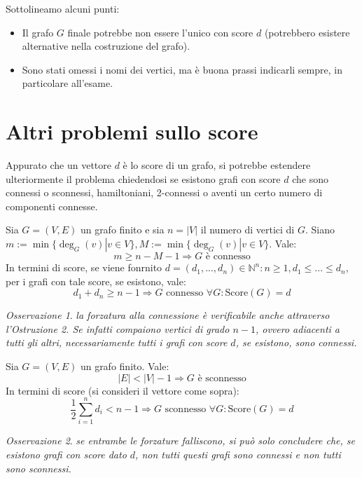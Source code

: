 \documentclass[oneside]{book}
\theoremstyle{remark}
\newtheorem*{osservaz}{Osservazione}
\begin{document}
\noindent Sottolineamo alcuni punti:
\begin{itemize}
    \item Il grafo $G$ finale potrebbe non essere l'unico con score $d$ (potrebbero esistere alternative nella costruzione del grafo).
    \item Sono stati omessi i nomi dei vertici, ma è buona prassi indicarli sempre, in particolare all'esame.
\end{itemize}

\section{Altri problemi sullo score}
Appurato che un vettore $d$ è lo score di un grafo, si potrebbe
estendere ulteriormente il problema chiedendosi se esistono
grafi con score $d$ che sono connessi o sconnessi, hamiltoniani,
2-connessi o aventi un certo numero di componenti connesse.

\begin{tcolorbox}[colback=red!30, colframe=red!30!black, title=Forzatura alla connessione]
Sia $G=(V,E)$ un grafo  finito e sia $n=|V|$ il numero
di vertici di $G$. Siano $m:=\min\{\deg_G(v)|v\in V\},
M:=\min\{\deg_G(v)|v\in V\}$. Vale:
\[ m\geq n-M-1 \Longrightarrow G \text{ è connesso} \]
In termini di score, se viene fonrnito $d=(d_1,...,d_n)\in\mathbb{N}^n:
n\geq1, d_1\leq...\leq d_n$, per i grafi con tale score, se
esistono, vale:
\[ d_1+d_n \geq n-1 \Longrightarrow G\text{ connesso }\forall G:\text{Score}(G)=d \]
\end{tcolorbox}
\begin{osservaz}
\emph{la forzatura alla connessione è verificabile
anche attraverso l'Ostruzione 2. Se infatti compaiono vertici di grado
$n-1$, ovvero adiacenti a tutti gli altri, necessariamente tutti i
grafi con score $d$, se esistono, sono connessi.}
\end{osservaz}

\begin{tcolorbox}[colback=red!30, colframe=red!30!black, title=Forzatura alla sconnessione]
Sia $G=(V,E)$ un grafo finito. Vale:
\[ |E|<|V|-1 \Longrightarrow G \text{ è sconnesso} \]
In termini di score (si consideri il vettore come sopra):
\[ \frac12\sum_{i=1}^{n}d_i < n-1 \Longrightarrow G\text{ sconnesso } \forall G:\text{Score}(G)=d \]
\end{tcolorbox}
\begin{osservaz}
\emph{se entrambe le forzature falliscono, si può solo
concludere che, se esistono grafi con score dato $d$, non tutti questi
grafi sono connessi e non tutti sono sconnessi.}
\end{osservaz}
\end{document}
